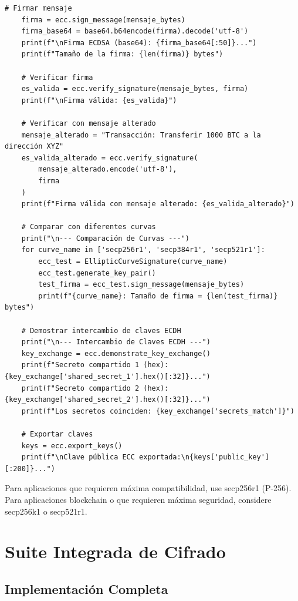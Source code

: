 \documentclass[12pt,a4paper]{article}
\begin{document}
\begin{lstlisting}[caption=Implementación de firma digital con curvas elípticas]
    # Firmar mensaje
    firma = ecc.sign_message(mensaje_bytes)
    firma_base64 = base64.b64encode(firma).decode('utf-8')
    print(f"\nFirma ECDSA (base64): {firma_base64[:50]}...")
    print(f"Tamaño de la firma: {len(firma)} bytes")
    
    # Verificar firma
    es_valida = ecc.verify_signature(mensaje_bytes, firma)
    print(f"\nFirma válida: {es_valida}")
    
    # Verificar con mensaje alterado
    mensaje_alterado = "Transacción: Transferir 1000 BTC a la dirección XYZ"
    es_valida_alterado = ecc.verify_signature(
        mensaje_alterado.encode('utf-8'), 
        firma
    )
    print(f"Firma válida con mensaje alterado: {es_valida_alterado}")
    
    # Comparar con diferentes curvas
    print("\n--- Comparación de Curvas ---")
    for curve_name in ['secp256r1', 'secp384r1', 'secp521r1']:
        ecc_test = EllipticCurveSignature(curve_name)
        ecc_test.generate_key_pair()
        test_firma = ecc_test.sign_message(mensaje_bytes)
        print(f"{curve_name}: Tamaño de firma = {len(test_firma)} bytes")
    
    # Demostrar intercambio de claves ECDH
    print("\n--- Intercambio de Claves ECDH ---")
    key_exchange = ecc.demonstrate_key_exchange()
    print(f"Secreto compartido 1 (hex): {key_exchange['shared_secret_1'].hex()[:32]}...")
    print(f"Secreto compartido 2 (hex): {key_exchange['shared_secret_2'].hex()[:32]}...")
    print(f"Los secretos coinciden: {key_exchange['secrets_match']}")
    
    # Exportar claves
    keys = ecc.export_keys()
    print(f"\nClave pública ECC exportada:\n{keys['public_key'][:200]}...")
\end{lstlisting}

\begin{securitygoodpractice}
    Para aplicaciones que requieren máxima compatibilidad, use secp256r1 (P-256). Para aplicaciones blockchain o que requieren máxima seguridad, considere secp256k1 o secp521r1.
\end{securitygoodpractice}

\newpage

\section{Suite Integrada de Cifrado}

\subsection{Implementación Completa}
\end{document}

